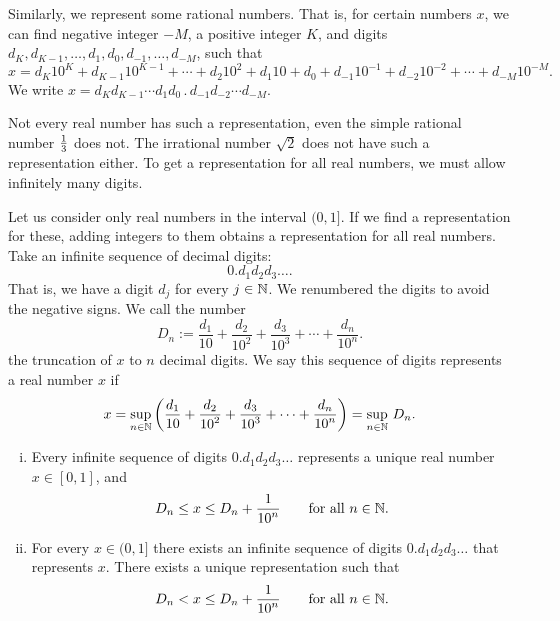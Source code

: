 Similarly, we
represent some rational numbers.  That is, for certain
numbers $x$, we can find
negative integer $-M$, a positive integer $K$, and digits
$d_K,d_{K-1},\ldots,d_1,d_0,d_{-1},\ldots,d_{-M}$, such that
\begin{equation*}
x = d_K {10}^K + d_{K-1} {10}^{K-1} + \cdots + d_2 {10}^2 + d_1 10 + d_0 
+ d_{-1} {10}^{-1} + d_{-2} {10}^{-2} + \cdots + d_{-M} {10}^{-M} .
\end{equation*}
We write $x = d_K d_{K-1} \cdots d_1 d_0 \, . \, d_{-1} d_{-2} \cdots d_{-M}$.

Not every real number has such a representation, even the simple
rational number $\nicefrac{1}{3}$ does not.  The irrational number $\sqrt{2}$ 
does not have such a representation either.  To get a representation for
all real numbers, we must allow infinitely many digits.

Let us consider only real numbers in the interval $(0,1]$.  If
we find a representation for these, adding 
integers to them obtains a representation for all real numbers.
Take an infinite sequence of decimal digits:
\begin{equation*}
0.d_1d_2d_3\ldots.
\end{equation*}
That is, we have a digit $d_j$ for every $j \in \N$.
We renumbered the digits to avoid the negative signs.
We call the number
\begin{equation*}
D_n := 
\frac{d_1}{10} + 
\frac{d_2}{{10}^2} + 
\frac{d_3}{{10}^3} + 
\cdots +
\frac{d_n}{{10}^n} .
\end{equation*}
the truncation of $x$ to $n$ decimal digits.
We say this
sequence of digits represents a real number $x$ if
\begin{equation*}
x =
\sup_{n \in \N} \left(
\frac{d_1}{10} + 
\frac{d_2}{{10}^2} + 
\frac{d_3}{{10}^3} + 
\cdots +
\frac{d_n}{{10}^n}
\right) =
\sup_{n \in \N} \, D_n .
\end{equation*}

\begin{prop} \label{prop:decimalprop}
\leavevmode
\begin{enumerate}[(i)]
\item
Every infinite sequence of digits
$0.d_1d_2d_3\ldots$ represents a unique real number $x \in [0,1]$, and
\begin{equation*}
D_n \leq x \leq D_n+\frac{1}{{10}^n} \qquad \text{for all } n \in \N.
\end{equation*}
\item
For every $x \in (0,1]$ there exists an infinite sequence of digits
$0.d_1d_2d_3\ldots$ that represents $x$.
There exists a unique representation such that
\begin{equation*}
D_n < x \leq D_n+\frac{1}{{10}^n} \qquad \text{for all } n \in \N.
\end{equation*}
\end{enumerate}
\end{prop}

